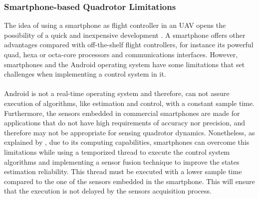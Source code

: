 \subsubsection{Smartphone-based Quadrotor Limitations}
The idea of using a smartphone as flight controller in an UAV opens the possibility of a quick and inexpensive development \cite{Aldrovandi2015}. A smartphone offers other advantages compared with off-the-shelf flight controllers, for instance its powerful quad, hexa or octa-core processors and communications interfaces. However, smartphones and the Android operating system have some limitations that set challenges when implementing a control system in it.\\\\
Android is not a real-time operating system and therefore, can not assure execution of algorithms, like estimation and control, with a constant sample time. Furthermore, the sensors embedded in commercial smartphones are made for applications that do not have high requirements of accuracy nor precision, and therefore may not be appropriate for sensing quadrotor dynamics. Nonetheless, as explained by \cite{Bryant2015}, due to its computing capabilities, smartphones can overcome this limitations while using a temporized thread to execute the control system algorithms and implementing a sensor fusion technique to improve the states estimation reliability. This thread must be executed with a lower sample time compared to the one of the sensors embedded in the smartphone. This will ensure that the execution is not delayed by the sensors acquisition process.


